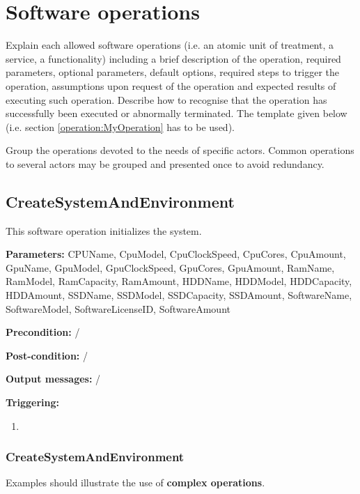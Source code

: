  \chapter{Software operations}
\label{chap:soptware_operations}


Explain each allowed software operations (i.e. an atomic unit of treatment, a service, a functionality) including a brief description of the operation, required parameters, optional parameters, default options, required steps to trigger the operation, assumptions upon request of the operation and expected results of executing such operation.
Describe how to recognise that the operation has successfully been executed or
abnormally terminated. The template given below (i.e. section \ref{operation:MyOperation} has to be used).

Group the operations devoted to the needs of specific actors. Common
operations to several actors may be grouped and presented once to avoid redundancy.



\section{CreateSystemAndEnvironment}
\label{operation:CreateSystemAndEnvironment}
This software operation initializes the system.
\begin{description}

\item \textbf{Parameters:} CPUName, CpuModel, CpuClockSpeed, CpuCores,
CpuAmount, GpuName, GpuModel, GpuClockSpeed, GpuCores, GpuAmount, RamName,
RamModel, RamCapacity, RamAmount, HDDName, HDDModel, HDDCapacity, HDDAmount,
SSDName, SSDModel, SSDCapacity, SSDAmount, SoftwareName, SoftwareModel,
SoftwareLicenseID, SoftwareAmount
\item \textbf{Precondition:} /
\item \textbf{Post-condition:} /
\item \textbf{Output messages:} /

\item \textbf{Triggering:}
\begin{enumerate}
\item 
\end{enumerate}

 
\end{description}

\subsection{CreateSystemAndEnvironment}
Examples should illustrate the use of \textbf{complex operations}.

